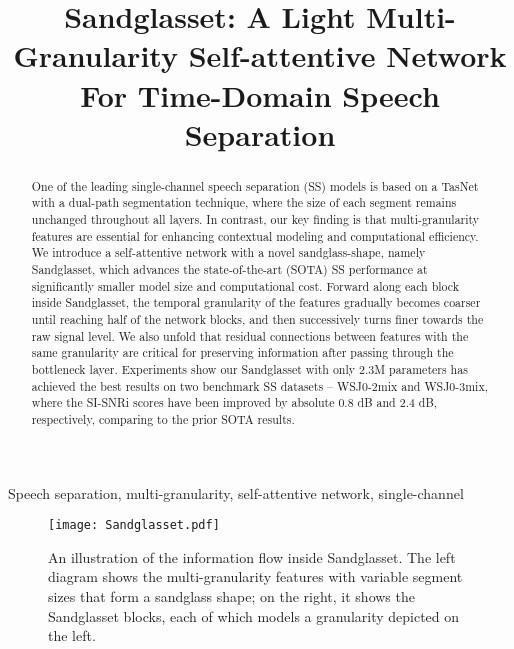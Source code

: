 \documentclass{article}
\title{Sandglasset: A Light Multi-Granularity Self-attentive Network For Time-Domain Speech Separation}
\begin{document}
\ninept
\maketitle
\begin{abstract}
\small
One of the leading single-channel speech separation (SS) models is based on a TasNet with a dual-path segmentation technique, where the size of each segment remains unchanged throughout all layers. In contrast, our key finding is that multi-granularity features are essential for enhancing contextual modeling and computational efficiency. We introduce a self-attentive network with a novel sandglass-shape, namely Sandglasset, which advances the state-of-the-art (SOTA) SS performance at significantly smaller model size and computational cost. Forward along each block inside Sandglasset, the temporal granularity of the features gradually becomes coarser until reaching half of the network blocks, and then successively turns finer towards the raw signal level. We also unfold that residual connections between features with the same granularity are critical for preserving information after passing through the bottleneck layer. Experiments show our Sandglasset with only 2.3M parameters has achieved the best results on two benchmark SS datasets -- WSJ0-2mix and WSJ0-3mix, where the SI-SNRi scores have been improved by absolute 0.8 dB and 2.4 dB, respectively, comparing to the prior SOTA results.
\end{abstract}
\begin{keywords}
Speech separation, multi-granularity, self-attentive network, single-channel
\end{keywords}

\begin{figure*}[t]
    \centering
    \texttt{[image: Sandglasset.pdf]}
    \caption{An illustration of the information flow inside Sandglasset. The left diagram shows the multi-granularity features with variable segment sizes that form a sandglass shape; on the right, it shows the Sandglasset blocks, each of which models a granularity depicted on the left.}
    \label{fig:1}
    \vspace{-3mm}
\end{figure*}
\end{document}
